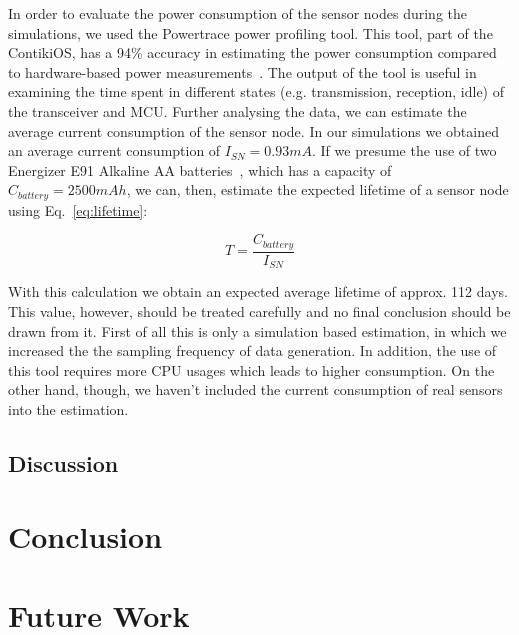 \documentclass[conference]{IEEEtran}
\begin{document}
In order to evaluate the power consumption of the sensor nodes during the simulations, 
we used the Powertrace power profiling tool. This tool, part of the ContikiOS, has a 
94\% accuracy in estimating the power consumption compared to hardware-based power 
measurements~\cite{powertrace}. The output of the tool is useful in examining the time 
spent in different states (e.g. transmission, reception, idle) of the transceiver and MCU.
Further analysing the data, we can estimate the average current consumption of the sensor node.
In our simulations we obtained an average current consumption of $I_{SN} = 0.93 mA$. If we presume
the use of two Energizer E91 Alkaline AA batteries~\cite{EnergizerBattery}, which has a capacity 
of $C_{battery} = 2500 mAh$, we can, then, estimate the expected lifetime of a sensor node using 
Eq.~\ref{eq:lifetime}:

\begin{equation}
\label{eq:lifetime}
T = \frac{C_{battery}}{I_{SN}}
\end{equation}

With this calculation we obtain an expected average lifetime of approx. 112 days. This value, 
however, should be treated carefully and no final conclusion should be drawn from it. First of all
this is only a simulation based estimation, in which we increased the the sampling frequency
of data generation. In addition, the use of this tool requires more CPU usages which leads to
higher consumption. On the other hand, though, we haven't included the current consumption of
real sensors into the estimation. 

\subsection{Discussion}

\section{Conclusion}

\section{Future Work}

\end{document}
